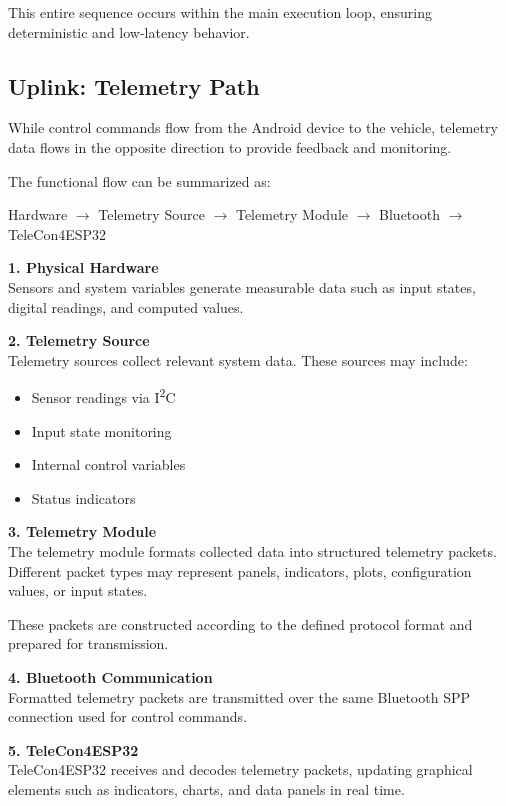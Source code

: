 This entire sequence occurs within the main execution loop, ensuring deterministic and low-latency behavior.

\subsection{Uplink: Telemetry Path}

While control commands flow from the Android device to the vehicle, telemetry data flows in the opposite direction to provide feedback and monitoring.

The functional flow can be summarized as:

\begin{center}
	Hardware $\rightarrow$ Telemetry Source $\rightarrow$ Telemetry Module $\rightarrow$ Bluetooth $\rightarrow$ TeleCon4ESP32
\end{center}

\textbf{1. Physical Hardware} \\
Sensors and system variables generate measurable data such as input states, digital readings, and computed values.

\textbf{2. Telemetry Source} \\
Telemetry sources collect relevant system data. These sources may include:

\begin{itemize}
	\item Sensor readings via I\textsuperscript{2}C
	\item Input state monitoring
	\item Internal control variables
	\item Status indicators
\end{itemize}

\textbf{3. Telemetry Module} \\
The telemetry module formats collected data into structured telemetry packets. Different packet types may represent panels, indicators, plots, configuration values, or input states.

These packets are constructed according to the defined protocol format and prepared for transmission.

\textbf{4. Bluetooth Communication} \\
Formatted telemetry packets are transmitted over the same Bluetooth SPP connection used for control commands.

\textbf{5. TeleCon4ESP32} \\
TeleCon4ESP32 receives and decodes telemetry packets, updating graphical elements such as indicators, charts, and data panels in real time.

